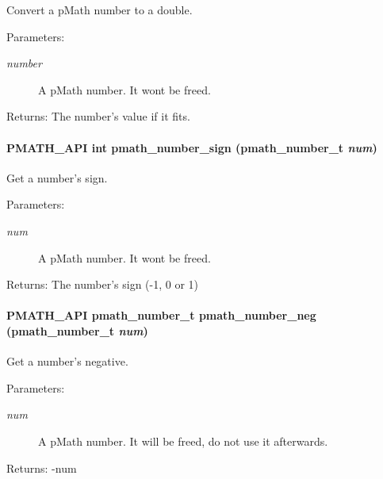 Convert a pMath number to a double. 

\begin{Desc}
\item[Parameters:]
\begin{description}
\item[{\em number}]A pMath number. It wont be freed. \end{description}
\end{Desc}
\begin{Desc}
\item[Returns:]The number's value if it fits. \end{Desc}
\hypertarget{group__numbers_g7a736f04d207d140b3b052438cc371d0}{
\paragraph[{pmath\_\-number\_\-sign}]{\setlength{\rightskip}{0pt plus 5cm}PMATH\_\-API int pmath\_\-number\_\-sign ({\bf pmath\_\-number\_\-t} {\em num})}\hfill}
\label{group__numbers_g7a736f04d207d140b3b052438cc371d0}


Get a number's sign. 

\begin{Desc}
\item[Parameters:]
\begin{description}
\item[{\em num}]A pMath number. It wont be freed. \end{description}
\end{Desc}
\begin{Desc}
\item[Returns:]The number's sign (-1, 0 or 1) \end{Desc}
\hypertarget{group__numbers_gfbfb5ee7f7cd966432e1cee6fa5b6bf5}{
\paragraph[{pmath\_\-number\_\-neg}]{\setlength{\rightskip}{0pt plus 5cm}PMATH\_\-API {\bf pmath\_\-number\_\-t} pmath\_\-number\_\-neg ({\bf pmath\_\-number\_\-t} {\em num})}\hfill}
\label{group__numbers_gfbfb5ee7f7cd966432e1cee6fa5b6bf5}


Get a number's negative. 

\begin{Desc}
\item[Parameters:]
\begin{description}
\item[{\em num}]A pMath number. It will be freed, do not use it afterwards. \end{description}
\end{Desc}
\begin{Desc}
\item[Returns:]-num \end{Desc}
